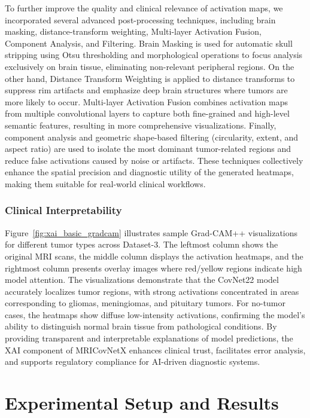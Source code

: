 \documentclass[a4paper,fleqn]{cas-sc}
\begin{document}
To further improve the quality and clinical relevance of activation maps, we incorporated several advanced post-processing techniques, including brain masking, distance-transform weighting, Multi-layer Activation Fusion, Component Analysis, and Filtering. Brain Masking is used for automatic skull stripping using Otsu thresholding and morphological operations to focus analysis exclusively on brain tissue, eliminating non-relevant peripheral regions. On the other hand, Distance Transform Weighting is applied to distance transforms to suppress rim artifacts and emphasize deep brain structures where tumors are more likely to occur.
Multi-layer Activation Fusion combines activation maps from multiple convolutional layers to capture both fine-grained and high-level semantic features, resulting in more comprehensive visualizations. Finally, component analysis and geometric shape-based filtering (circularity, extent, and aspect ratio) are used to isolate the most dominant tumor-related regions and reduce false activations caused by noise or artifacts. These techniques collectively enhance the spatial precision and diagnostic utility of the generated heatmaps, making them suitable for real-world clinical workflows.

\subsubsection{Clinical Interpretability}

Figure~\ref{fig:xai_basic_gradcam} illustrates sample Grad-CAM++ visualizations for different tumor types across Dataset-3. The leftmost column shows the original MRI scans, the middle column displays the activation heatmaps, and the rightmost column presents overlay images where red/yellow regions indicate high model attention. The visualizations demonstrate that the CovNet22 model accurately localizes tumor regions, with strong activations concentrated in areas corresponding to gliomas, meningiomas, and pituitary tumors. For no-tumor cases, the heatmaps show diffuse low-intensity activations, confirming the model's ability to distinguish normal brain tissue from pathological conditions. By providing transparent and interpretable explanations of model predictions, the XAI component of MRICovNetX enhances clinical trust, facilitates error analysis, and supports regulatory compliance for AI-driven diagnostic systems.

\section{Experimental Setup and Results}
\label{sec4}
\end{document}
